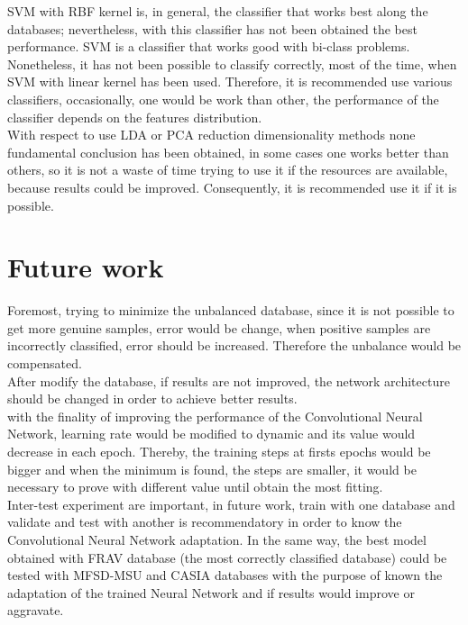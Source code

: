 SVM with RBF kernel is, in general, the classifier that works best along the databases; nevertheless, with this classifier has not been obtained the best performance. SVM is a classifier that works good with bi-class problems. Nonetheless, it has not been possible to classify correctly, most of the time, when SVM with linear kernel has been used. Therefore, it is recommended use various classifiers, occasionally, one would be work than other, the performance of the classifier depends on the features distribution.\\


With respect to use LDA or PCA reduction dimensionality methods none fundamental conclusion has been obtained, in some cases one works better than others, so it is not a waste of time trying to use it if the resources are available, because results could be improved. Consequently, it is recommended use it if it is possible.


\section{Future work}
Foremost, trying to minimize the unbalanced database, since it is not possible to get more genuine samples, error would be change, when positive samples are incorrectly classified, error should be increased. Therefore the unbalance would be compensated.\\

After modify the database, if results are not improved, the network architecture should be changed in order to achieve better results.\\

with the finality of improving the performance of the Convolutional Neural Network, learning rate would be modified to dynamic and its value would decrease in each epoch. Thereby, the training steps at firsts epochs would be bigger and when the minimum is found, the steps are smaller, it would be necessary to prove with different value until obtain the most fitting.\\

Inter-test experiment are important, in future work, train with one database and validate and test with another is recommendatory in order to know the Convolutional Neural Network adaptation. In the same way, the best model obtained with FRAV database (the most correctly classified database) could be tested with MFSD-MSU and CASIA databases with the purpose of known the adaptation of the trained Neural Network and if results would improve or aggravate.\\

